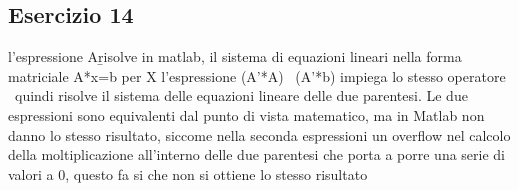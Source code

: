 \subsection{Esercizio 14}
l'espressione A\b risolve in matlab,  il sistema di equazioni lineari nella forma matriciale A*x=b per X
l'espressione (A'*A) \ (A'*b) impiega lo stesso operatore \, quindi risolve il sistema delle equazioni lineare delle due parentesi.
Le due espressioni sono equivalenti dal punto di vista matematico, ma in Matlab non danno lo stesso risultato, siccome nella seconda espressioni un overflow nel calcolo della moltiplicazione all'interno delle due parentesi che porta a porre una serie di valori a 0, questo fa si che non si ottiene lo stesso risultato